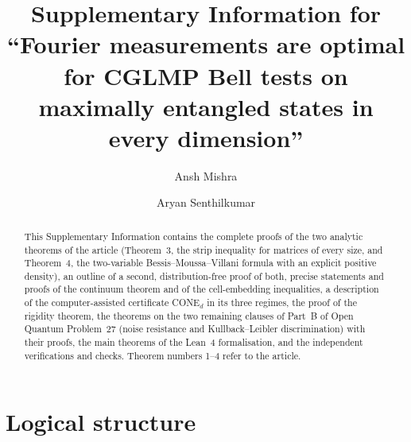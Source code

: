 \documentclass[11pt]{amsart}
\theoremstyle{definition}
\theoremstyle{remark}
\numberwithin{equation}{section}
\begin{document}
\title[Supplementary Information]{Supplementary Information for\\ ``Fourier measurements are optimal for CGLMP Bell
tests on maximally entangled states in every dimension''}

\author{Ansh Mishra}
\address{Independent researcher, Cumming, GA, USA}
\author{Aryan Senthilkumar}
\address{Independent researcher, Johns Creek, GA, USA}


\begin{abstract}
This Supplementary Information contains the complete proofs of the two analytic theorems of the article
(Theorem~3, the strip inequality for matrices of every size, and Theorem~4, the two-variable
Bessis--Moussa--Villani formula with an explicit positive density), an outline of a second, distribution-free proof of
both, precise statements and proofs of the continuum theorem and of the cell-embedding inequalities, a description of
the computer-assisted certificate CONE$_d$ in its three regimes, the proof of the rigidity theorem, the theorems on the
two remaining clauses of Part~B of Open Quantum Problem~27 (noise resistance and Kullback--Leibler discrimination) with
their proofs, the main theorems of the Lean~4 formalisation, and the independent verifications and checks. Theorem
numbers 1--4 refer to the article.
\end{abstract}

\maketitle

\tableofcontents

\section{Logical structure}\label{sec:structure}
\end{document}
